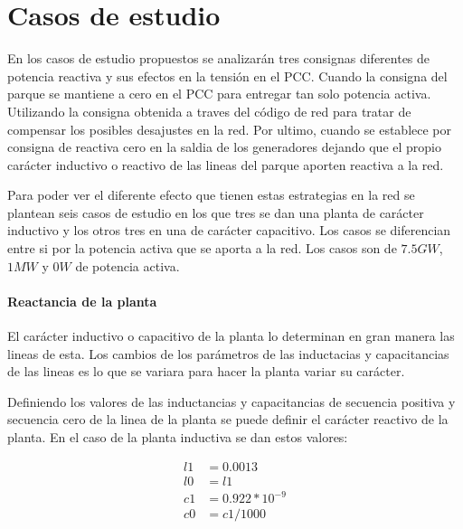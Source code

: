 \documentclass{book}
\begin{document}
	\section{Casos de estudio}

En los casos de estudio propuestos se analizar\'an tres consignas diferentes de potencia reactiva y sus efectos en la tensi\'on en el PCC. Cuando la consigna del parque se mantiene a cero en el PCC para entregar tan solo potencia activa. Utilizando la consigna obtenida a traves del c\'odigo de red para tratar de compensar los posibles desajustes en la red. Por ultimo, cuando se establece por consigna de reactiva cero en la saldia de los generadores dejando que el propio car\'acter inductivo o reactivo de las lineas del parque aporten reactiva a la red. \par

Para poder ver el diferente efecto que tienen estas estrategias en la red se plantean seis casos de estudio en los que tres se dan una planta de car\'acter inductivo y los otros tres en una de car\'acter capacitivo. Los casos se diferencian entre si por la potencia activa que se aporta a la red. Los casos son de $7.5 GW$, $1MW$ y $0W$ de potencia activa.  \par

\paragraph{Reactancia de la planta}

El car\'acter inductivo o capacitivo de la planta lo determinan en gran manera las lineas de esta. Los cambios de los par\'ametros de las inductacias y capacitancias de las lineas es lo que se variara para hacer la planta variar su car\'acter. \par

Definiendo los valores de las inductancias y capacitancias de secuencia positiva y secuencia cero de la linea de la planta se puede definir el car\'acter reactivo de la planta. En el caso de la planta inductiva se dan estos valores:

\begin{equation}
\begin{split}
l1 & =0.0013 \\
l0 & =l1\\
c1 & =0.922* 10^{-9} \\
c0 & =c1/1000 \\
\end{split}
\end{equation}
\end{document}
